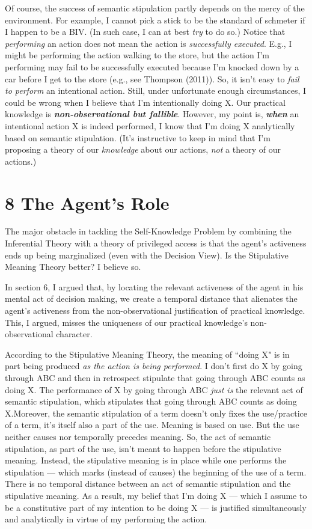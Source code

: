 \documentclass[a4paper,12pt]{article}
\begin{document}
Of course, the success of semantic stipulation partly depends on the mercy of the environment. For example, I cannot pick a stick to be the standard of schmeter if I happen to be a BIV. (In such case, I can at best \emph{try} to do so.) Notice that \emph{performing} an action does not mean the action is \emph{successfully executed}. E.g., I might be performing the action walking to the store, but the action I'm performing may fail to be successfully executed because I'm knocked down by a car before I get to the store (e.g., see Thompson (2011)). So, it isn't easy to \emph{fail to perform} an intentional action. Still, under unfortunate enough circumstances, I could be wrong when I believe that I'm intentionally doing X. Our practical knowledge is \textbf{\emph{non-observational but fallible}}. However, my point is, \emph\textbf{{when}} an intentional action X is indeed performed, I know that I'm doing X analytically based on semantic stipulation. (It's instructive to keep in mind that I'm proposing a theory of our \emph{knowledge} about our actions, \emph{not} a theory of our actions.)

\section*{8 The Agent's Role}

The major obstacle in tackling the Self-Knowledge Problem by combining the Inferential Theory with a theory of privileged access is that the agent's activeness ends up being marginalized (even with the Decision View). Is the Stipulative Meaning Theory better? I believe so.
 
In section 6, I argued that, by locating the relevant activeness of the agent in his mental act of decision making, we create a temporal distance that alienates the agent's activeness from the non-observational justification of practical knowledge. This, I argued, misses the uniqueness of our practical knowledge's non-observational character.

According to the Stipulative Meaning Theory, the meaning of ``doing X" is in part being produced \emph{as the action is being performed}. I don't first do X by going through ABC and then in retrospect stipulate that going through ABC counts as doing X. The performance of X by going through ABC \emph{just is} the relevant act of semantic stipulation, which stipulates that going through ABC counts as doing X.\footnotemark Moreover, the semantic stipulation of a term doesn't only fixes the use/practice of a term, it's itself also a part of the use. Meaning is based on use. But the use neither causes nor temporally precedes meaning. So, the act of semantic stipulation, as part of the use, isn't meant to happen before the stipulative meaning. Instead, the stipulative meaning is in place while one performs the stipulation --- which marks (instead of causes) the beginning of the use of a term. There is no temporal distance between an act of semantic stipulation and the stipulative meaning. As a result, my belief that I'm doing X --- which I assume to be a constitutive part of my intention to be doing X --- is justified simultaneously and analytically in virtue of my performing the action.
\end{document}

